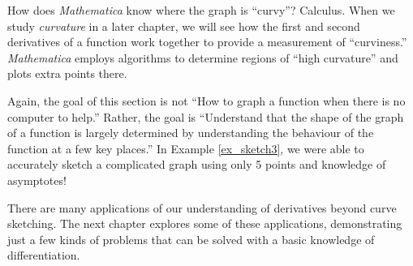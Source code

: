 How does \textit{Mathematica} know where the graph is ``curvy''? Calculus. When we study \textit{curvature} in a later chapter, we will see how the first and second derivatives of a function work together to provide a measurement of ``curviness.'' \textit{Mathematica} employs algorithms to determine regions of ``high curvature'' and plots extra points there.

Again, the goal of this section is not ``How to graph a function when there is no computer to help.'' Rather, the goal is ``Understand that the shape of the graph of a function is largely determined by understanding the behaviour of the function at a few key places.'' In Example \ref{ex_sketch3}, we were able to accurately sketch a complicated graph using only 5 points and knowledge of asymptotes!

There are many applications of our understanding of derivatives beyond curve sketching. The next chapter explores some of these applications, demonstrating just a few kinds of problems that can be solved with a basic knowledge of differentiation. 

